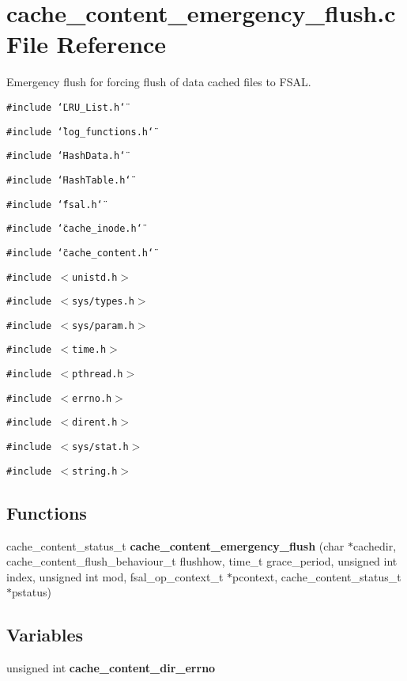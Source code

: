 \section{cache\_\-content\_\-emergency\_\-flush.c File Reference}
\label{cache__content__emergency__flush_8c}
Emergency flush for forcing flush of data cached files to FSAL. 

{\tt \#include \char`\"{}LRU\_\-List.h\char`\"{}}\par
{\tt \#include \char`\"{}log\_\-functions.h\char`\"{}}\par
{\tt \#include \char`\"{}Hash\-Data.h\char`\"{}}\par
{\tt \#include \char`\"{}Hash\-Table.h\char`\"{}}\par
{\tt \#include \char`\"{}fsal.h\char`\"{}}\par
{\tt \#include \char`\"{}cache\_\-inode.h\char`\"{}}\par
{\tt \#include \char`\"{}cache\_\-content.h\char`\"{}}\par
{\tt \#include $<$unistd.h$>$}\par
{\tt \#include $<$sys/types.h$>$}\par
{\tt \#include $<$sys/param.h$>$}\par
{\tt \#include $<$time.h$>$}\par
{\tt \#include $<$pthread.h$>$}\par
{\tt \#include $<$errno.h$>$}\par
{\tt \#include $<$dirent.h$>$}\par
{\tt \#include $<$sys/stat.h$>$}\par
{\tt \#include $<$string.h$>$}\par
\subsection*{Functions}
\begin{CompactItemize}
\item 
cache\_\-content\_\-status\_\-t {\bf cache\_\-content\_\-emergency\_\-flush} (char $\ast$cachedir, cache\_\-content\_\-flush\_\-behaviour\_\-t flushhow, time\_\-t grace\_\-period, unsigned int index, unsigned int mod, fsal\_\-op\_\-context\_\-t $\ast$pcontext, cache\_\-content\_\-status\_\-t $\ast$pstatus)
\end{CompactItemize}
\subsection*{Variables}
\begin{CompactItemize}
\item 
unsigned int {\bf cache\_\-content\_\-dir\_\-errno}
\end{CompactItemize}


